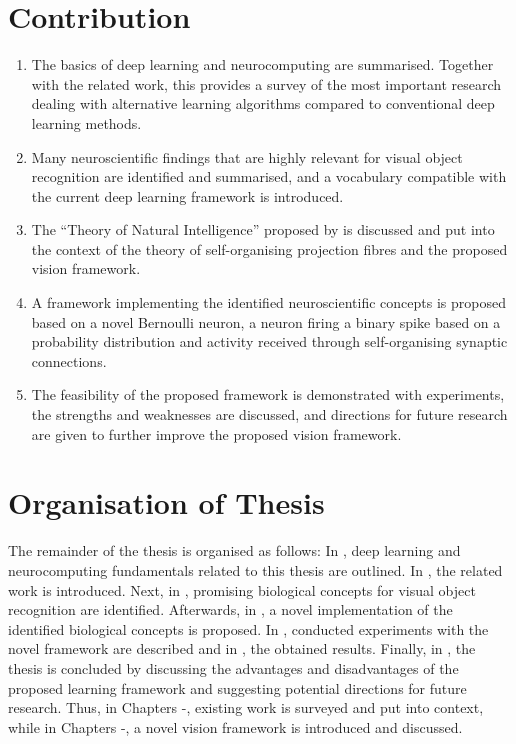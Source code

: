 \section{Contribution}
\begin{enumerate}
	\item The basics of deep learning and neurocomputing are summarised. Together with the related work, this provides a survey of the most important research dealing with alternative learning algorithms compared to conventional deep learning methods.
    \item Many neuroscientific findings that are highly relevant for visual object recognition are identified and summarised, and a vocabulary compatible with the current deep learning framework is introduced.
	\item The ``Theory of Natural Intelligence'' proposed by  is discussed and put into the context of the theory of self-organising projection fibres  and the proposed vision framework.
	\item A framework implementing the identified neuroscientific concepts is proposed based on a novel Bernoulli neuron,  a neuron firing a binary spike based on a probability distribution and activity received through self-organising synaptic connections. 
    \item The feasibility of the proposed framework is demonstrated with experiments, the strengths and weaknesses are discussed, and directions for future research are given to further improve the proposed vision framework.
\end{enumerate}


\section{Organisation of Thesis}
The remainder of the thesis is organised as follows: In , deep learning and neurocomputing fundamentals related to this thesis are outlined.
In , the related work is introduced. Next, in , promising biological concepts for visual object recognition are identified.
Afterwards, in , a novel implementation of the identified biological concepts is proposed.
In , conducted experiments with the novel framework are described and in , the obtained results.
Finally, in , the thesis is concluded by discussing the advantages and disadvantages of the proposed learning framework and suggesting potential directions for future research.
Thus, in Chapters -, existing work is surveyed and put into context, while in Chapters -, a novel vision framework is introduced and discussed.
